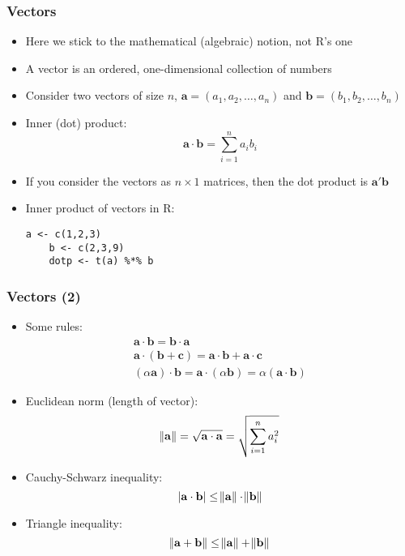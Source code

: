 \documentclass[10pt]{beamer}
\theoremstyle{definition}
\begin{document}
\begin{frame}[fragile]
\frametitle{Vectors}
\begin{itemize}
	\item Here we stick to the mathematical (algebraic) notion, not R's one
	\item A vector is an ordered, one-dimensional collection of numbers
	\item Consider two vectors of size $n$, $\mathbf{a} = (a_{1}, a_{2},\ldots,a_{n})$ and $\mathbf{b} = (b_{1}, b_{2},\ldots,b_{n})$
	\item Inner (dot) product:
	\[
		\mathbf{a\cdot b} = \sum_{i=1}^{n}a_{i}b_{i}
	\]
	\item If you consider the vectors as $n \times 1$ matrices, then the dot product is $\mathbf{a'b}$
	\item Inner product of vectors in R:
	\begin{lstlisting}[style = rstyle, breaklines]
	a <- c(1,2,3)
	b <- c(2,3,9)
	dotp <- t(a) %*% b	
	\end{lstlisting}
\end{itemize}
\end{frame}

\begin{frame}[fragile]
\frametitle{Vectors (2)}
\begin{itemize}
	\item Some rules:
	\[
		\begin{array}{lcl}
			\mathbf{a\cdot b = b\cdot a} \\
			\mathbf{a\cdot(b + c) = a\cdot b + a\cdot c}\\
			(\alpha\mathbf{a})\cdot \mathbf{b} = \mathbf{a}\cdot(\alpha\mathbf{b}) = \alpha(\mathbf{a\cdot b})
		\end{array}
	\]
	\item Euclidean norm (length of vector):
	\[
		\norm{\mathbf{a}} = \sqrt{\mathbf{a\cdot a}} = \sqrt{\sum_{i=1}^{n}a_{i}^{2}}
	\]
	\item Cauchy-Schwarz inequality:
	\[
		|\mathbf{a\cdot b}| \leq \norm{\mathbf{a}}\cdot \norm{\mathbf{b}}
	\]
	\item Triangle inequality:
	\[
		\norm{\mathbf{a + b}} \leq \norm{\mathbf{a}} + \norm{\mathbf{b}}
	\]
\end{itemize}
\end{frame}
\end{document}
